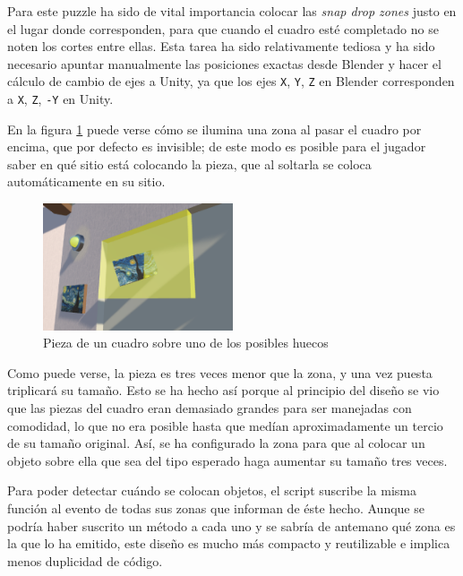 Para este puzzle ha sido de vital importancia colocar las \textit{snap drop zones} justo en el lugar donde corresponden, para que cuando el cuadro esté completado no se noten los cortes entre ellas. Esta tarea ha sido relativamente tediosa y ha sido necesario apuntar manualmente las posiciones exactas desde Blender y hacer el cálculo de cambio de ejes a Unity, ya que los ejes \texttt{X}, \texttt{Y}, \texttt{Z} en Blender corresponden a \texttt{X}, \texttt{Z}, \texttt{-Y} en Unity.

En la figura \ref{fig:painting-piece-hover} puede verse cómo se ilumina una zona al pasar el cuadro por encima, que por defecto es invisible; de este modo es posible para el jugador saber en qué sitio está colocando la pieza, que al soltarla se coloca automáticamente en su sitio.

\begin{figure}[!h]
\begin{center}
\includegraphics[width=0.5\textwidth]{imagenes/7/painting-piece-hover.png}
\caption{Pieza de un cuadro sobre uno de los posibles huecos}
\label{fig:painting-piece-hover}
\end{center}
\vspace{-0.35cm}
\end{figure}

Como puede verse, la pieza es tres veces menor que la zona, y una vez puesta triplicará su tamaño. Esto se ha hecho así porque al principio del diseño se vio que las piezas del cuadro eran demasiado grandes para ser manejadas con comodidad, lo que no era posible hasta que medían aproximadamente un tercio de su tamaño original. Así, se ha configurado la zona para que al colocar un objeto sobre ella que sea del tipo esperado haga aumentar su tamaño tres veces.

Para poder detectar cuándo se colocan objetos, el script suscribe la misma función al evento de todas sus zonas que informan de éste hecho. Aunque se podría haber suscrito un método a cada uno y se sabría de antemano qué zona es la que lo ha emitido, este diseño es mucho más compacto y reutilizable e implica menos duplicidad de código.

